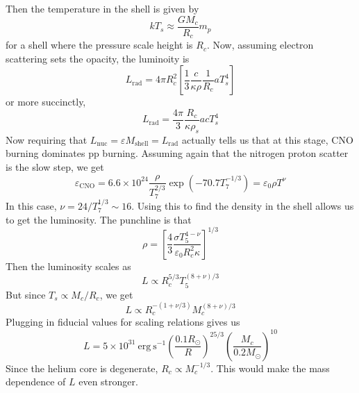 \documentclass[10pt]{article}
\numberwithin{equation}{section}
\newcommand{\n}{\noindent}
\begin{document}
    \n Then the temperature in the shell is given by
    \begin{equation}
      \label{eq:240}
      kT_s\approx \frac{GM_c}{R_c}m_p
    \end{equation}
    for a shell where the pressure scale height is $R_c$. Now,
    assuming electron scattering sets the opacity, the luminoity is
    \begin{equation}
      \label{eq:241}
      L_{\mathrm{rad}}=4\pi R_c^2\left[\frac{1}{3}\frac{c}{\kappa\rho}\frac{1}{R_c}aT_s^4\right]
    \end{equation}
    or more succinctly,
    \begin{equation}
      \label{eq:242}
      \boxed{L_{\mathrm{rad}}=\frac{4\pi}{3}\frac{R_c}{\kappa\rho_s}acT_s^4}
    \end{equation}
    Now requiring that $L_{\mathrm{nuc}}=\varepsilon
    M_{\mathrm{shell}}=L_{\mathrm{rad}}$ actually tells us that at
    this stage, CNO burning dominates pp burning. Assuming again that
    the nitrogen proton scatter is the slow step, we get
    \begin{equation}
      \label{eq:243}
      \varepsilon_{\mathrm{CNO}}=6.6\times
      10^{24}\frac{\rho}{T_7^{2/3}}\exp\left(-70.7
        T_7^{-1/3}\right)=\varepsilon_0\rho T^\nu
    \end{equation}
    In this case, $\nu=24/T_7^{1/3}\sim 16$. Using this to find the
    density in the shell allows us to get the luminosity. The
    punchline is that 
    \begin{equation}
      \label{eq:244}
      \rho=\left[\frac{4}{3}\frac{\sigma T_5^{4-\nu}}{\varepsilon_0R_c^2\kappa}\right]^{1/3}
    \end{equation}
    Then the luminosity scales as
    \begin{equation}
      \label{eq:245}
      L\propto R_c^{5/3}T_5^{(8+\nu)/3}
    \end{equation}
    But since $T_s\propto M_c/R_c$, we get
    \begin{equation}
      \label{eq:246}
      L\propto R_c^{-(1+\nu/3)}M_c^{(8+\nu)/3}
    \end{equation}
    Plugging in fiducial values for scaling relations gives us
    \begin{equation}
      \label{eq:247}
      L=5\times 10^{31}\ \mathrm{erg\ s^{-1}}\left(\frac{0.1R_\odot}{R}\right)^{25/3}\left(\frac{M_c}{0.2M_\odot}\right)^{10}
    \end{equation}
    Since the helium core is degenerate, $R_c\propto M_c^{-1/3}$. This
    would make the mass dependence of $L$ even stronger. \\
\end{document}
